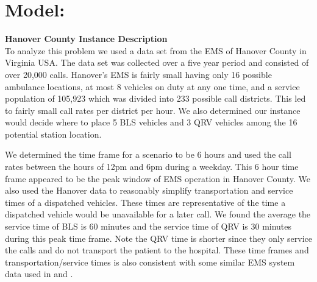 \documentclass[12pt]{report}
\begin{document}
\section*{ Model:}
\noindent\textbf{Hanover County Instance Description}\\
\indent To analyze this problem we used a data set from the EMS of Hanover County in Virginia USA. The data set was collected over a five year period and consisted of over 20,000 calls. Hanover's EMS is fairly small having only 16 possible ambulance locations, at most 8 vehicles on duty at any one time, and a service population of 105,923 which was divided into 233 possible call districts. This led to fairly small call rates per district per hour. We also determined our instance would decide where to place 5 BLS vehicles and 3 QRV vehicles among the 16 potential station location. 

We determined the time frame for a scenario to be 6 hours and used the call rates between the hours of 12pm and 6pm during a weekday. This 6 hour time frame appeared to be the peak window of EMS operation in Hanover County. We also used the Hanover data to reasonably simplify transportation and service times of a dispatched vehicles. These times are representative of the time a dispatched vehicle would be unavailable for a later call. We found the average the service time of BLS is 60 minutes and the service time of QRV is 30 minutes during this peak time frame. Note the QRV time is shorter since they only service the calls and do not transport the patient to the hospital. These time frames and transportation/service times is also consistent with some similar EMS system data used in\citet{naoum} and  \citet{abou}.
\end{document}
